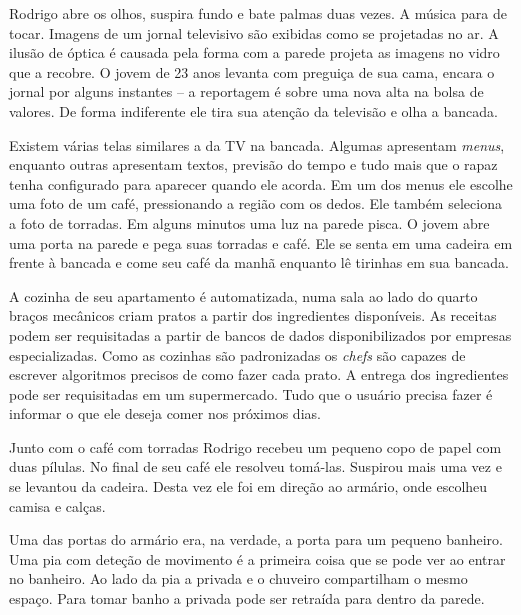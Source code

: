 \documentclass{book}
\begin{document}
Rodrigo abre os olhos, suspira fundo e bate palmas duas vezes. A música para de
tocar. Imagens de um jornal televisivo são exibidas como se projetadas no ar. A
ilusão de óptica é causada pela forma com a parede projeta as imagens no vidro
que a recobre. O jovem de 23 anos levanta com preguiça de sua cama, encara o
jornal por alguns instantes -- a reportagem é sobre uma nova alta na bolsa de
valores. De forma indiferente ele tira sua atenção da televisão e olha a
bancada.

Existem várias telas similares a da TV na bancada. Algumas apresentam
\emph{menus}, enquanto outras apresentam textos, previsão do tempo e tudo
mais que o rapaz tenha configurado para aparecer quando ele acorda. Em um dos
menus ele escolhe uma foto de um café, pressionando a região com os dedos. Ele
também seleciona a foto de torradas. Em alguns minutos uma luz na parede pisca.
O jovem abre uma porta na parede e pega suas torradas e café. Ele se senta em
uma cadeira em frente à bancada e come seu café da manhã enquanto lê tirinhas em
sua bancada.

A cozinha de seu apartamento é automatizada, numa sala ao lado do quarto braços
mecânicos criam pratos a partir dos ingredientes disponíveis. As receitas podem
ser requisitadas a partir de bancos de dados disponibilizados por empresas
especializadas. Como as cozinhas são padronizadas os \emph{chefs} são capazes de
escrever algoritmos precisos de como fazer cada prato. A entrega dos
ingredientes pode ser requisitadas em um supermercado. Tudo que o usuário
precisa fazer é informar o que ele deseja comer nos próximos dias.

Junto com o café com torradas Rodrigo recebeu um pequeno copo de papel com duas
pílulas. No final de seu café ele resolveu tomá-las. Suspirou mais uma vez e se
levantou da cadeira. Desta vez ele foi em direção ao armário, onde escolheu
camisa e calças.

Uma das portas do armário era, na verdade, a porta para um pequeno banheiro.
Uma pia com deteção de movimento é a primeira coisa que se pode ver ao entrar no
banheiro. Ao lado da pia a privada e o chuveiro compartilham o mesmo espaço.
Para tomar banho a privada pode ser retraída para dentro da parede.
\end{document}
